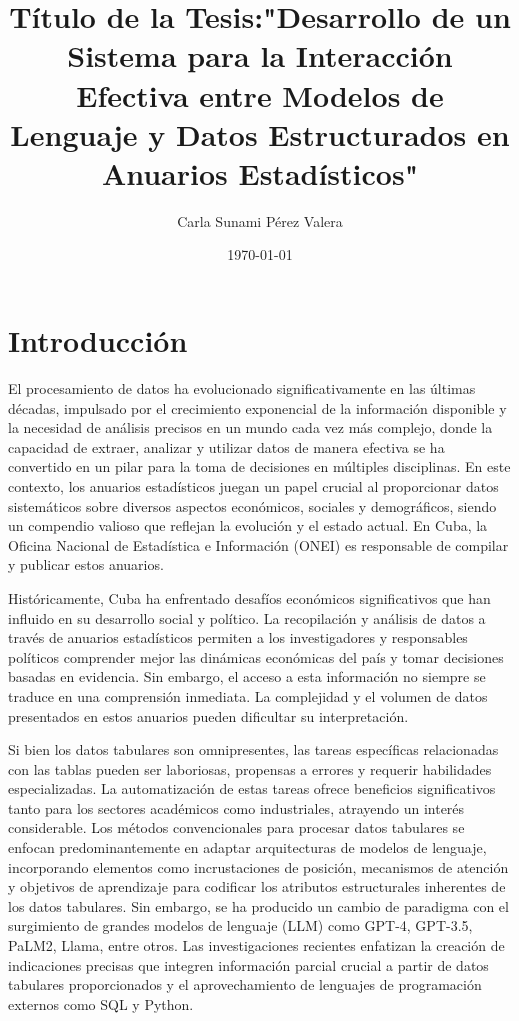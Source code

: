 \documentclass[12pt]{report} %
\title{Título de la Tesis:"Desarrollo de un Sistema para la Interacción Efectiva entre Modelos de Lenguaje y Datos Estructurados en Anuarios Estadísticos"}
\author{Carla Sunami Pérez Valera}
\date{\today}
\begin{document}
\maketitle


\chapter*{Introducción} %

El procesamiento de datos ha evolucionado significativamente en las últimas décadas, impulsado por el crecimiento exponencial de la información disponible y la necesidad de análisis precisos en un mundo cada vez más complejo, donde la capacidad de extraer, analizar y utilizar datos de manera efectiva se ha convertido en un pilar para la toma de decisiones en múltiples disciplinas. En este contexto, los anuarios estadísticos juegan un papel crucial al proporcionar datos sistemáticos sobre diversos aspectos económicos, sociales y demográficos, siendo un compendio valioso que reflejan la evolución y el estado actual. En Cuba, la Oficina Nacional de Estadística e Información (ONEI) es responsable de compilar y publicar estos anuarios.\par
Históricamente, Cuba ha enfrentado desafíos económicos significativos que han influido en su desarrollo social y político. La recopilación y análisis de datos a través de anuarios estadísticos permiten a los investigadores y responsables políticos comprender mejor las dinámicas económicas del país y tomar decisiones basadas en evidencia. Sin embargo, el acceso a esta información no siempre se traduce en una comprensión inmediata. La complejidad y el volumen de datos presentados en estos anuarios pueden dificultar su interpretación.\par
Si bien los datos tabulares son omnipresentes, las tareas específicas relacionadas con las tablas pueden ser laboriosas, propensas a errores y requerir habilidades especializadas. La automatización de estas tareas ofrece beneficios significativos tanto para los sectores académicos como industriales, atrayendo un interés considerable. Los métodos convencionales para procesar datos tabulares se enfocan predominantemente en adaptar arquitecturas de modelos de lenguaje, incorporando elementos como incrustaciones de posición, mecanismos de atención y objetivos de aprendizaje para codificar los atributos estructurales inherentes de los datos tabulares. Sin embargo, se ha producido un cambio de paradigma con el surgimiento de grandes modelos de lenguaje (LLM) como GPT-4, GPT-3.5, PaLM2, Llama, entre otros. Las investigaciones recientes enfatizan la creación de indicaciones precisas que integren información parcial crucial a partir de datos tabulares proporcionados y el aprovechamiento de lenguajes de programación externos como SQL y Python.\cite{1} \par
\end{document}
